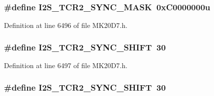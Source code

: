 \subsubsection[{\texorpdfstring{I2\+S\+\_\+\+T\+C\+R2\+\_\+\+S\+Y\+N\+C\+\_\+\+M\+A\+SK}{I2S_TCR2_SYNC_MASK}}]{\setlength{\rightskip}{0pt plus 5cm}\#define I2\+S\+\_\+\+T\+C\+R2\+\_\+\+S\+Y\+N\+C\+\_\+\+M\+A\+SK~0x\+C0000000u}\hypertarget{group___i2_s___register___masks_ga2626d37b42ede711d867e8f750fb2c2c}{}\label{group___i2_s___register___masks_ga2626d37b42ede711d867e8f750fb2c2c}


Definition at line 6496 of file M\+K20\+D7.\+h.

\subsubsection[{\texorpdfstring{I2\+S\+\_\+\+T\+C\+R2\+\_\+\+S\+Y\+N\+C\+\_\+\+S\+H\+I\+FT}{I2S_TCR2_SYNC_SHIFT}}]{\setlength{\rightskip}{0pt plus 5cm}\#define I2\+S\+\_\+\+T\+C\+R2\+\_\+\+S\+Y\+N\+C\+\_\+\+S\+H\+I\+FT~30}\hypertarget{group___i2_s___register___masks_ga7817b4e017fd01d7ca9a59e87008656f}{}\label{group___i2_s___register___masks_ga7817b4e017fd01d7ca9a59e87008656f}


Definition at line 6497 of file M\+K20\+D7.\+h.

\subsubsection[{\texorpdfstring{I2\+S\+\_\+\+T\+C\+R2\+\_\+\+S\+Y\+N\+C\+\_\+\+S\+H\+I\+FT}{I2S_TCR2_SYNC_SHIFT}}]{\setlength{\rightskip}{0pt plus 5cm}\#define I2\+S\+\_\+\+T\+C\+R2\+\_\+\+S\+Y\+N\+C\+\_\+\+S\+H\+I\+FT~30}\hypertarget{group___i2_s___register___masks_ga7817b4e017fd01d7ca9a59e87008656f}{}\label{group___i2_s___register___masks_ga7817b4e017fd01d7ca9a59e87008656f}


